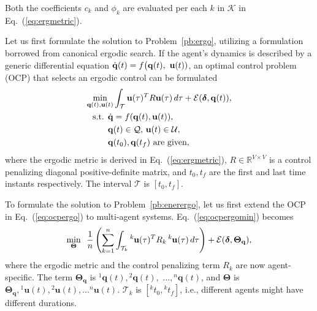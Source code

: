 \documentclass[letterpaper,10pt,conference,twoside]{IEEEtran}
\theoremstyle{definition}
\begin{document}
Both the coefficients $c_k$ and $\phi_k$ are evaluated per each $k$ in $\mathcal{K}$ in Eq.~(\ref{eq:ergmetric}).

Let us first formulate the solution to Problem~\ref{pb:ergo}, utilizing a formulation borrowed from canonical ergodic search.
If the agent's dynamics is described by a generic differential equation $\dot{\mathbf{q}}(t)=f\big({\small\mathbf{q}(t),}$ ${\small\mathbf{u}(t)})$, an optimal control problem (OCP) that selects an ergodic control can be formulated~\cite{ayvali2017ergodic}
\begin{subequations}\vspace*{-.4cm}\label{eq:ocpergo}\begin{align}
  \min_{\mathbf{q}(t),\mathbf{u}(t)}&\int_{\mathcal{T}}\mathbf{u}(\tau)^TR\mathbf{u}(\tau)\,d\tau+{\mathcal{E}(\boldsymbol{\delta},\mathbf{q}(t))},\label{eq:ocpergomin}\\
  \text{s.t. }\dot{\mathbf{q}}&=f(\mathbf{q}(t),\mathbf{u}(t)),\\
  \mathbf{q}&(t)\in\mathcal{Q},\,\mathbf{u}(t)\in\mathcal{U},\\
  \mathbf{q}&(t_0), \mathbf{q}(t_f)\text{ are given},\label{eq:ocpconsttotf}
\end{align}\end{subequations}
where the ergodic metric is derived in Eq.~(\ref{eq:ergmetric}), $R\in\mathbb{R}^{V\times V}$ is a control penalizing diagonal positive-definite matrix, and $t_0, t_f$ are the first and last time instants respectively. 
The interval $\mathcal{T}$ is $[t_0, t_f]$.%

To formulate the solution to Problem~\ref{pb:enerergo}, let us first extend the OCP in Eq.~(\ref{eq:ocpergo}) to multi-agent systems. Eq.~(\ref{eq:ocpergomin}) becomes
\begin{equation}\label{eq:ocpergomulti}
  \min_{\boldsymbol{\Theta}}\,\,\,{\frac{1}{n}\left(\sum_{k=1}^{n}\int_{\mathcal{T}_k}{}^k\hspace*{-.1ex}\mathbf{u}(\tau)^TR_k\,{}^k\hspace*{-.1ex}\mathbf{u}(\tau)\,d\tau\right)+\mathcal{E}(\boldsymbol{\delta},\boldsymbol{\Theta}_{\mathbf{q}})},
\end{equation}
where the ergodic metric and the control penalizing term $R_k$ are now agent-specific. The term $\boldsymbol{\Theta}_{\mathbf{q}}$ is ${}^1\mathbf{q}(t),{}^2\mathbf{q}(t),$ $\dots,{}^n\mathbf{q}(t)$, and $\boldsymbol{\Theta}$ is $\boldsymbol{\Theta}_{\mathbf{q}},{}^1\mathbf{u}(t),{}^2\mathbf{u}(t),\dots{}^n\mathbf{u}(t)$. $\mathcal{T}_k$ is $[{}^kt_0, {}^kt_f]$, i.e., different agents might have different durations.
\end{document}
